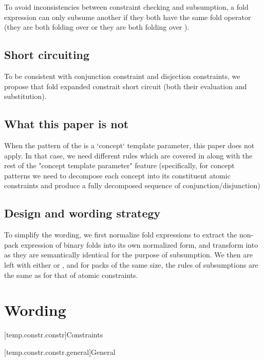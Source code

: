 \documentclass{wg21}
\begin{document}
To avoid inconsistencies between constraint checking and subsumption, a fold expression can only subsume another if they both have the same fold operator
(they are both folding over \tcode{\&\&} or they are both folding over \tcode{||}).

\subsection{Short circuiting}

To be consistent with conjunction constraint and disjection constraints, we propose that fold expanded constrait short circuit (both their evaluation and substitution).



\subsection{What this paper is not}

When the pattern of the  is a `concept` template parameter, this paper does not apply. In that case, we need different rules which are covered in  along with the rest of the "concept template parameter" feature (specifically, for concept patterns we need to decompose each concept into its constituent atomic constraints and produce a fully decomposed sequence of conjunction/disjunction)


\subsection{Design and wording strategy}

To simplify the wording, we first normalize fold expressions to extract the non-pack expression of binary folds into its own normalized form,
and transform  into  as they are semantically identical for the purpose of subsumption.
We then are left with either  or , and for packs of the same size, the rules of subsumptions are the same as for that of atomic constraints.

\section{Wording}

[temp.constr.constr]{Constraints}

[temp.constr.constr.general]{General}

%
\end{document}
